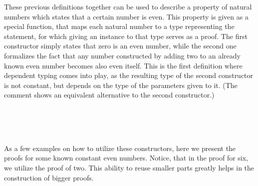 These previous definitions together can be used to describe a property of natural numbers which states that a certain number is even. This property is given as a special function, that maps each natural number to a type representing the statement, for which giving an instance to that type serves as a proof. The first constructor simply states that zero is an even number, while the second one formalizes the fact that any number constructed by adding two to an already known even number becomes also even itself. This is the first definition where dependent typing comes into play, as the resulting type of the second constructor is not constant, but depends on the type of the parameters given to it. (The comment shows an equivalent alternative to the second constructor.)

\begin{code}
    \>[0]\AgdaSpace{}%
    \AgdaSpace{}%
    \AgdaSymbol{:}\AgdaSpace{}%
    \AgdaSpace{}%
    \AgdaSpace{}%
    \AgdaSpace{}%
    \<%
    \\
    \>[0][@{}l@{\AgdaIndent{0}}]%
    \>[2]%
    \>[10]\AgdaSymbol{:}\AgdaSpace{}%
    \AgdaSpace{}%
    \<%
    \\
    \>[2]\AgdaSpace{}%
    \AgdaSymbol{:}\AgdaSpace{}%
    \AgdaSymbol{\{}\AgdaSpace{}%
    \AgdaSymbol{:}\AgdaSpace{}%
    \AgdaSymbol{\}}\AgdaSpace{}%
    \AgdaSpace{}%
    \AgdaSpace{}%
    \AgdaSpace{}%
    \AgdaSpace{}%
    \AgdaSpace{}%
    \AgdaSymbol{(}\AgdaSpace{}%
    \AgdaOperator{\AgdaFunction{+}}\AgdaSpace{}%
    \AgdaSymbol{)}\<%
    \\
    \>[2]\<%
\end{code}

As a few examples on how to utilize these constructors, here we present the proofs for some known constant even numbers. Notice, that in the proof for six, we utilize the proof of two. This ability to reuse smaller parts greatly helps in the construction of bigger proofs.

